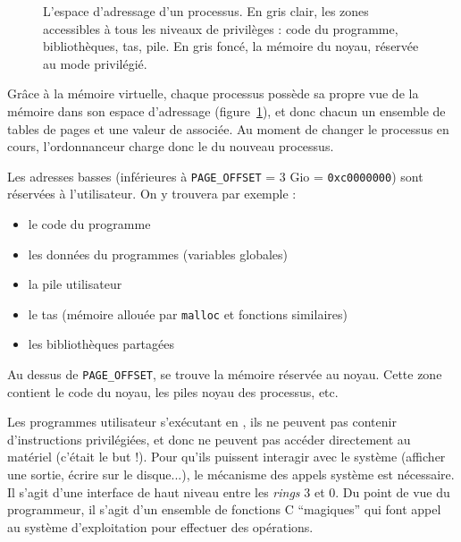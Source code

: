 \begin{figure} %
\centering


\caption[Espace d'adressage d'un processus]{L'espace d'adressage d'un processus.
En gris clair, les zones accessibles à tous les niveaux de privilèges : code du
programme, bibliothèques, tas, pile. En gris foncé, la mémoire du noyau,
réservée au mode privilégié.}

\label{fig:memmap}
\end{figure}

Grâce à la mémoire virtuelle, chaque processus possède sa propre vue de la
mémoire dans son espace d'adressage (figure~\ref{fig:memmap}), et donc chacun
un ensemble de tables de pages et une valeur de \crtrois associée. Au moment de
changer le processus en cours, l'ordonnanceur charge donc le \crtrois du nouveau
processus.

Les adresses basses (inférieures à \texttt{PAGE\_OFFSET} = 3 Gio =
\texttt{0xc0000000}) sont réservées à l'utilisateur. On y trouvera par exemple :

\begin{itemize}
\item le code du programme
\item les données du programmes (variables globales)
\item la pile utilisateur
\item le tas (mémoire allouée par \texttt{malloc} et fonctions similaires)
\item les bibliothèques partagées
\end{itemize}

Au dessus de \texttt{PAGE\_OFFSET}, se trouve la mémoire réservée au noyau.
Cette zone contient le code du noyau, les piles noyau des processus, etc.

\label{sec:impl-syscall}


Les programmes utilisateur s'exécutant en , ils ne peuvent pas
contenir d'instructions privilégiées, et donc ne peuvent pas accéder directement
au matériel (c'était le but !). Pour qu'ils puissent interagir avec le système
(afficher une sortie, écrire sur le disque...), le mécanisme des appels système
est nécessaire. Il s'agit d'une interface de haut niveau entre les \emph{rings}
3 et 0. Du point de vue du programmeur, il s'agit d'un ensemble de fonctions C
``magiques'' qui font appel au système d'exploitation pour effectuer des
opérations.

